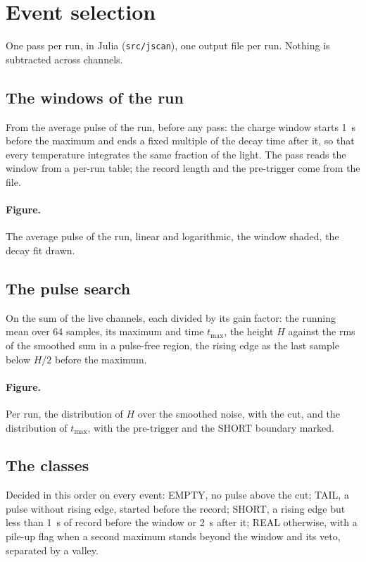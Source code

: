 \documentclass[11pt]{article}
\newcommand{\code}[1]{\texttt{#1}}
\newcommand{\us}{\textmu s\xspace}
\begin{document}
\section{Event selection}
\label{sec:selection}

One pass per run, in Julia (\code{src/jscan}), one output file per run.
Nothing is subtracted across channels.

\subsection{The windows of the run}

From the average pulse of the run, before any pass: the charge window
starts 1~\us before the maximum and ends a fixed multiple of the decay
time after it, so that every temperature integrates the same fraction of
the light. The pass reads the window from a per-run table; the record
length and the pre-trigger come from the file.

\paragraph{Figure.} The average pulse of the run, linear and
logarithmic, the window shaded, the decay fit drawn.

\subsection{The pulse search}

On the sum of the live channels, each divided by its gain factor: the
running mean over 64 samples, its maximum and time $t_{\max}$, the
height $H$ against the rms of the smoothed sum in a pulse-free region,
the rising edge as the last sample below $H/2$ before the maximum.

\paragraph{Figure.} Per run, the distribution of $H$ over the smoothed
noise, with the cut, and the distribution of $t_{\max}$, with the
pre-trigger and the SHORT boundary marked.

\subsection{The classes}

Decided in this order on every event: EMPTY, no pulse above the cut;
TAIL, a pulse without rising edge, started before the record; SHORT, a
rising edge but less than 1~\us of record before the window or 2~\us
after it; REAL otherwise, with a pile-up flag when a second maximum
stands beyond the window and its veto, separated by a valley.
\end{document}
